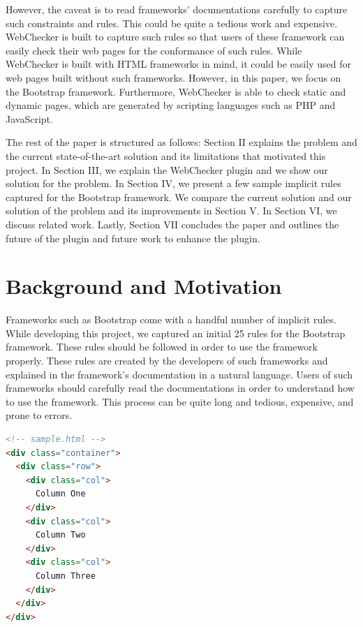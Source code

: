 \documentclass[conference]{IEEETran}
\begin{document}
However, the caveat is to read frameworks' documentations carefully to capture such constraints and rules. This could be quite a tedious work and expensive. WebChecker is built to capture such rules so that users of these framework can easily check their web pages for the conformance of such rules. While WebChecker is built with HTML frameworks in mind, it could be easily used for web pages built without such frameworks. However, in this paper, we focus on the Bootstrap framework. Furthermore, WebChecker is able to check static and dynamic pages, which are generated by scripting languages such as PHP and JavaScript. 

The rest of the paper is structured as follows: Section II explains the problem and the current state-of-the-art solution and its limitations that motivated this project. In Section III, we explain the WebChecker plugin and we show our solution for the problem. In Section IV, we present a few sample implicit rules captured for the Bootstrap framework. We compare the current solution and our solution of the problem and its improvements in Section V. In Section VI, we discuss related work. Lastly, Section VII concludes the paper and outlines the future of the plugin and future work to enhance the plugin.  

\section{Background and Motivation}

Frameworks such as Bootstrap come with a handful number of implicit rules. While developing this project, we captured an initial 25 rules for the Bootstrap framework. These rules should be followed in order to use the framework properly. These rules are created by the developers of such frameworks and explained in the framework’s documentation in a natural language. Users of such frameworks should carefully read the documentations in order to understand how to use the framework. This process can be quite long and tedious, expensive, and prone to errors. 

\begin{lstlisting}[language=HTML, caption=Bootstrap Grid Example, label={lst:bge}]
<!-- sample.html -->
<div class="container">
  <div class="row">
    <div class="col">
      Column One
    </div>
    <div class="col">
      Column Two
    </div>
    <div class="col">
      Column Three
    </div>
  </div>
</div>
\end{lstlisting}
\end{document}
